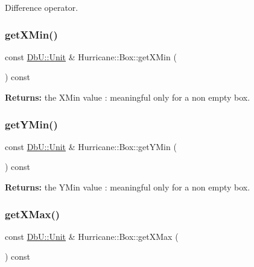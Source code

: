Difference operator. \mbox{\label{classHurricane_1_1Box_ad5122ef7dda8a58c1dacddb57cd4ccfb}} 
\subsubsection{\texorpdfstring{get\+X\+Min()}{getXMin()}}
{\footnotesize\ttfamily const \hyperlink{group__DbUGroup_ga4fbfa3e8c89347af76c9628ea06c4146}{Db\+U\+::\+Unit} \& Hurricane\+::\+Box\+::get\+X\+Min (\begin{DoxyParamCaption}{ }\end{DoxyParamCaption}) const\hspace{0.3cm}{\ttfamily [inline]}}

{\bfseries Returns\+:} the X\+Min value \+: meaningful only for a non empty box. \mbox{\label{classHurricane_1_1Box_a542c383466845aeca0e32f51b77c7439}} 
\subsubsection{\texorpdfstring{get\+Y\+Min()}{getYMin()}}
{\footnotesize\ttfamily const \hyperlink{group__DbUGroup_ga4fbfa3e8c89347af76c9628ea06c4146}{Db\+U\+::\+Unit} \& Hurricane\+::\+Box\+::get\+Y\+Min (\begin{DoxyParamCaption}{ }\end{DoxyParamCaption}) const\hspace{0.3cm}{\ttfamily [inline]}}

{\bfseries Returns\+:} the Y\+Min value \+: meaningful only for a non empty box. \mbox{\label{classHurricane_1_1Box_a77b9db757080544fcede3e670cee8c5c}} 
\subsubsection{\texorpdfstring{get\+X\+Max()}{getXMax()}}
{\footnotesize\ttfamily const \hyperlink{group__DbUGroup_ga4fbfa3e8c89347af76c9628ea06c4146}{Db\+U\+::\+Unit} \& Hurricane\+::\+Box\+::get\+X\+Max (\begin{DoxyParamCaption}{ }\end{DoxyParamCaption}) const\hspace{0.3cm}{\ttfamily [inline]}}

